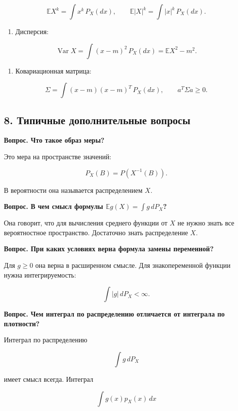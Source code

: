 \documentclass[
  11pt,
  a4paper,
]{article}
\providecommand{\tightlist}{%
  \setlength{\itemsep}{0pt}\setlength{\parskip}{0pt}}
\begin{document}
\[
\mathbb EX^k=\int x^k\,P_X(dx),
\qquad
\mathbb E|X|^k=\int |x|^k\,P_X(dx).
\]

\begin{enumerate}
\def\labelenumi{\arabic{enumi}.}
\setcounter{enumi}{5}
\tightlist
\item
  Дисперсия:
\end{enumerate}

\[
\operatorname{Var}X
=
\int (x-m)^2\,P_X(dx)
=
\mathbb EX^2-m^2.
\]

\begin{enumerate}
\def\labelenumi{\arabic{enumi}.}
\setcounter{enumi}{6}
\tightlist
\item
  Ковариационная матрица:
\end{enumerate}

\[
\Sigma=\int (x-m)(x-m)^T\,P_X(dx),
\qquad
a^T\Sigma a\ge0.
\]

\subsection{8. Типичные дополнительные
вопросы}\label{ux442ux438ux43fux438ux447ux43dux44bux435-ux434ux43eux43fux43eux43bux43dux438ux442ux435ux43bux44cux43dux44bux435-ux432ux43eux43fux440ux43eux441ux44b}

\textbf{Вопрос. Что такое образ меры?}

Это мера на пространстве значений:

\[
P_X(B)=P(X^{-1}(B)).
\]

В вероятности она называется распределением \(X\).

\textbf{Вопрос. В чем смысл формулы \(\mathbb E g(X)=\int g\,dP_X\)?}

Она говорит, что для вычисления среднего функции от \(X\) не нужно знать
все вероятностное пространство. Достаточно знать распределение \(X\).

\textbf{Вопрос. При каких условиях верна формула замены переменной?}

Для \(g\ge0\) она верна в расширенном смысле. Для знакопеременной
функции нужна интегрируемость:

\[
\int |g|\,dP_X<\infty.
\]

\textbf{Вопрос. Чем интеграл по распределению отличается от интеграла по
плотности?}

Интеграл по распределению

\[
\int g\,dP_X
\]

имеет смысл всегда. Интеграл

\[
\int g(x)p_X(x)\,dx
\]
\end{document}
